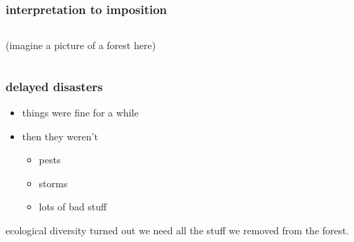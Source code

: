 \documentclass[presentation]{subfiles}
\begin{document}
\begin{frame}\frametitle{interpretation to imposition}
  

  \begin{columns}
  \begin{column}{0.6\textwidth}
  \centering
(imagine a picture of a forest here)
\end{column}
  \begin{column}{0.4\textwidth}
  \centering
  \end{column}
  \end{columns}

\end{frame}


\begin{frame}[t]\frametitle{delayed disasters}
  \begin{itemize}
    \item things were fine for a while
    \item then they weren't
      \begin{itemize}
        \item pests
        \item storms
        \item lots of bad stuff
      \end{itemize}
  \end{itemize}

\vfill

\centering
{}

\vfill

\end{frame}


\begin{frame}{ecological diversity}
  turned out we need all the stuff we removed from the forest.

\end{frame}
\end{document}
